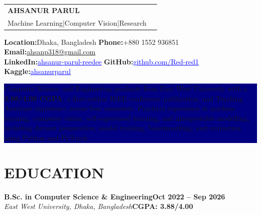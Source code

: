 \documentclass[10pt,a4paper]{article}
\newcommand{\contact}[2]{\textbf{#1}\;#2}
\newcommand{\reslink}[2]{\href{#1}{\textcolor{blue}{\underline{#2}}}}
\begin{document}
\small

\begin{tabularx}{\textwidth}{@{}X r@{}}
    {\color{navy}\fontsize{21}{22}\selectfont\textbf{AHSANUR PARUL}} &
    \begin{minipage}[t]{0.39\textwidth}\raggedleft
        {\color{blue}\small\bfseries CSE GRADUATE}\\[-1pt]
        {\color{muted}\scriptsize Machine Learning\;|\;Computer Vision\;|\;Research}
    \end{minipage}
\end{tabularx}
\vspace{3pt}

\small
\contact{Location:}{Dhaka, Bangladesh}\hfill
\contact{Phone:}{+880 1552 936851}\hfill
\contact{Email:}{\href{mailto:ahsanp318@gmail.com}{ahsanp318@gmail.com}}\\[2pt]
\contact{LinkedIn:}{\reslink{https://www.linkedin.com/in/ahsanur-parul-reedee-36a5b02a0}{ahsanur-parul-reedee}}\hfill
\contact{GitHub:}{\reslink{https://github.com/Red-red1}{github.com/Red-red1}}\hfill
\contact{Kaggle:}{\reslink{https://www.kaggle.com/ahsanurparul}{ahsanurparul}}

\vspace{5pt}

\noindent\colorbox{navy}{%
  \parbox{\dimexpr\textwidth-2\fboxsep\relax}{%
    \color{white}\small
    Computer Science and Engineering graduate from East West University with a
    \textbf{3.88/4.00 CGPA}, a first-author IEEE conference publication, and
    Teaching Assistant experience across four semesters. Practical experience
    in machine learning, computer vision, self-supervised learning, and
    interpretable modelling, including dataset preparation, model training,
    benchmarking, and evaluation using Python and PyTorch.
  }%
}

\section*{EDUCATION}
\textbf{B.Sc. in Computer Science \& Engineering}\hfill\textbf{Oct 2022 -- Sep 2026}\\[-1pt]
\textit{East West University, Dhaka, Bangladesh}\hfill\textbf{CGPA: 3.88/4.00}
\end{document}
